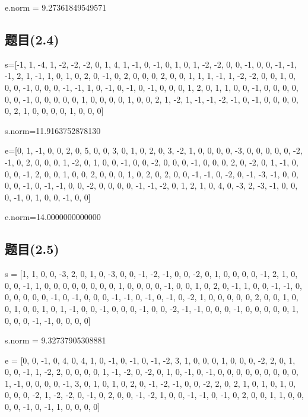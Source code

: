 \documentclass[12pt,a4paper]{article}
\numberwithin{equation}{section}
\begin{document}
e.norm = 9.27361849549571

\subsection{题目(2.4)}

s=[-1, 1, -4, 1, -2, -2, -2, 0, 1, 4, 1, -1, 0, -1, 0, 1, 0, 1, -2, -2, 0, 0, -1, 0, 0, -1, -1, -1, 2, 1, -1, 1, 0, 1, 0, 2, 0, -1, 0, 2, 0, 0, 0, 2, 0, 0, 1, 1, 1, -1, 1, -2, -2, 0, 0, 1, 0, 0, 0, -1, 0, 0, 0, -1, -1, 1, 0, -1, 0, -1, 0, -1, 0, 0, 0, 1, 2, 0, 1, 1, 0, 0, -1, 0, 0, 0, 0, 0, 0, -1, 0, 0, 0, 0, 0, 1, 0, 0, 0, 0, 1, 0, 0, 2, 1, -2, 1, -1, -1, -2, -1, 0, -1, 0, 0, 0, 0, 0, 2, 1, 0, 0, 0, 0, 1, 0, 0, 0]

s.norm=11.9163752878130

\hspace*{\fill}

e=[0, 1, -1, 0, 0, 2, 0, 5, 0, 0, 3, 0, 1, 0, 2, 0, 3, -2, 1, 0, 0, 0, 0, -3, 0, 0, 0, 0, 0, -2, -1, 0, 2, 0, 0, 0, 1, -2, 0, 1, 0, 0, -1, 0, 0, -2, 0, 0, 0, -1, 0, 0, 0, 2, 0, -2, 0, 1, -1, 0, 0, 0, -1, 2, 0, 0, 1, 0, 0, 2, 0, 0, 0, 1, 0, 2, 0, 2, 0, 0, -1, -1, 0, -2, 0, -1, -3, -1, 0, 0, 0, 0, -1, 0, -1, -1, 0, 0, -2, 0, 0, 0, 0, -1, -1, -2, 0, 1, 2, 1, 0, 4, 0, -3, 2, -3, -1, 0, 0, 0, -1, 0, 1, 0, 0, -1, 0, 0]

e.norm=14.0000000000000

\subsection{题目(2.5)}

s = [1, 1, 0, 0, -3, 2, 0, 1, 0, -3, 0, 0, -1, -2, -1, 0, 0, -2, 0, 1, 0, 0, 0, 0, -1, 2, 1, 0, 0, 0, -1, 1, 0, 0, 0, 0, 0, 0, 0, 0, 1, 0, 0, 0, 0, -1, 0, 0, 1, 0, 2, 0, -1, 1, 0, 0, -1, -1, 0, 0, 0, 0, 0, 0, -1, 0, -1, 0, 0, 0, -1, -1, 0, -1, 0, -1, 0, -2, 1, 0, 0, 0, 0, 0, 2, 0, 0, 1, 0, 0, 1, 0, 0, 1, 0, 1, -1, 0, 0, -1, 0, 0, 0, -1, 0, 0, -2, -1, -1, 0, 0, 0, -1, 0, 0, 0, 0, 0, 1, 0, 0, 0, -1, -1, 0, 0, 0, 0]

s.norm =  9.32737905308881

\hspace*{\fill}

e = [0, 0, -1, 0, 4, 0, 4, 1, 0, -1, 0, -1, 0, -1, -2, 3, 1, 0, 0, 0, 1, 0, 0, 0, -2, 2, 0, 1, 0, 0, -1, 1, -2, 2, 0, 0, 0, 0, 1, -1, -2, 0, -2, 0, 1, 0, -1, 0, -1, 0, 0, 0, 0, 0, 0, 0, 0, 0, 1, -1, 0, 0, 0, 0, -1, 3, 0, 1, 0, 1, 0, 2, 0, -1, -2, -1, 0, 0, -2, 2, 0, 2, 1, 0, 1, 0, 1, 0, 0, 0, 0, -2, 1, -2, -2, 0, -1, 0, 2, 0, 0, -1, -2, 1, 0, 0, -1, -1, 0, -1, 0, 2, 0, 0, 1, 1, 0, 0, 0, 0, -1, 0, -1, 1, 0, 0, 0, 0]
\end{document}
